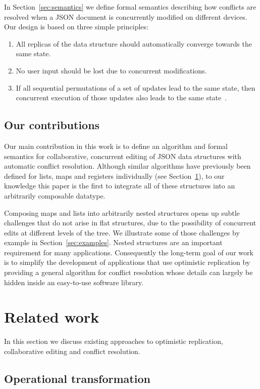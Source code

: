\documentclass[10pt,journal,compsoc]{IEEEtran}
\begin{document}
In Section~\ref{sec:semantics} we define formal semantics describing how conflicts are resolved when a JSON document is concurrently modified on different devices. Our design is based on three simple principles:
\begin{enumerate}
\item All replicas of the data structure should automatically converge towards the same state.
\item No user input should be lost due to concurrent modifications.
\item If all sequential permutations of a set of updates lead to the same state, then concurrent execution of those updates also leads to the same state~\cite{Bieniusa:2012gt}.
\end{enumerate}

\subsection{Our contributions}

Our main contribution in this work is to define an algorithm and formal semantics for collaborative, concurrent editing of JSON data structures with automatic conflict resolution. Although similar algorithms have previously been defined for lists, maps and registers individually (see Section~\ref{sec:related}), to our knowledge this paper is the first to integrate all of these structures into an arbitrarily composable datatype.

Composing maps and lists into arbitrarily nested structures opens up subtle challenges that do not arise in flat structures, due to the possibility of concurrent edits at different levels of the tree. We illustrate some of those challenges by example in Section~\ref{sec:examples}. Nested structures are an important requirement for many applications.
Consequently the long-term goal of our work is to simplify the development of applications that use optimistic replication by providing a general algorithm for conflict resolution whose details can largely be hidden inside an easy-to-use software library.

\section{Related work}\label{sec:related}

In this section we discuss existing approaches to optimistic replication, collaborative editing and conflict resolution.

\subsection{Operational transformation}\label{sec:related-ot}
\end{document}
